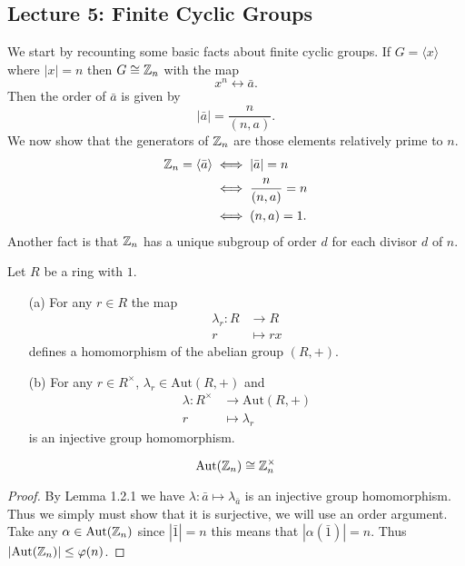 \documentclass[11pt,leqno,oneside]{amsart}
\newcommand{\Aut}{\text{Aut}}  %
\begin{document}
\subsection*{Lecture 5: Finite Cyclic Groups}
We start by recounting some basic facts about finite cyclic groups. If
\(G=\langle x\rangle\) where \(|x|=n\) then \(G \mathrel{\cong} {\mathbb Z}_n\) with the map
\[x^n \longleftrightarrow \bar{a}.\] Then the order of \(\bar{a}\) is given by
\[|\bar{a}|=\frac{n}{(n,a)}.\] We now show that the generators of \({\mathbb Z}_n\) are
those elements relatively prime to \(n\).
\begin{align*}
  {\mathbb Z}_n = \langle \bar{a} \rangle &\iff |\bar{a}|=n\\
                                 &\iff \frac{n}{(n,a)}=n\\
                                 &\iff (n,a)=1.
\end{align*}
Another fact is that \({\mathbb Z}_n\) has a unique subgroup of order \(d\) for each
divisor \(d\) of \(n\).
\begin{lem*}[1.2.1] Let \(R\) be a ring with \(1\).
  \begin{enumerate}
  \item[(a)] For any \(r \in R\) the map
    \begin{align*}
      \lambda_r \colon R &\to R\\
      r &\mapsto rx
    \end{align*}
    defines a homomorphism of the abelian group \((R,+)\).
  \item[(b)] For any \(r \in R^\times\), \(\lambda_r \in \Aut(R,+)\) and
    \begin{align*}
      \lambda \colon R^\times &\to \Aut(R,+)\\
      r &\mapsto \lambda_r
    \end{align*}
    is an injective group homomorphism.
  \end{enumerate}

\end{lem*}
\begin{prop*}[1.2.2]
  \[\Aut(\Z_n) \isom \Z_n^\times\]
\end{prop*}
\begin{proof}
  By Lemma 1.2.1 we have \(\lambda \colon \bar{a} \mapsto \lambda_{\bar{a}}\) is
  an injective group homomorphism. Thus we simply must show that it is
  surjective, we will use an order argument. Take any \(\alpha \in \Aut(\Z_n)\)
  since \(|\bar{1}|=n\) this means that \(|\alpha(\bar{1})|=n\). Thus
  \(|\Aut(\Z_n)| \le \varphi(n)\).
\end{proof}
\end{document}
